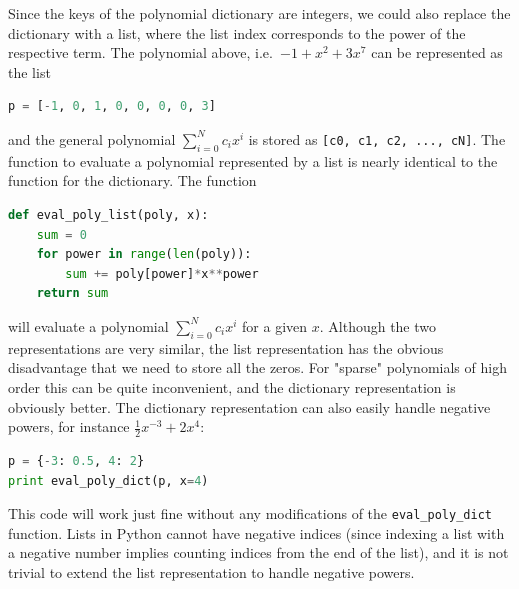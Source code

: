 \documentclass[graybox,envcountchap,sectrefs,final]{svmonodo}
\begin{document}
Since the keys of the polynomial dictionary are integers, we could also replace the dictionary
with a list, where the list index corresponds to the power of the respective term.
The polynomial above, i.e.~$-1 + x^2 + 3x^7$ can be represented as the list
\begin{lstlisting}[language=Python,style=blue1]
p = [-1, 0, 1, 0, 0, 0, 0, 3]
\end{lstlisting}
and the general polynomial $\sum_{i=0}^N c_ix^i$ is stored as
\texttt{[c0, c1, c2, ..., cN]}. The function to evaluate a polynomial represented by a list is
nearly identical to the function for the dictionary. The function
\begin{lstlisting}[language=Python,style=blue1]
def eval_poly_list(poly, x):
    sum = 0
    for power in range(len(poly)):
        sum += poly[power]*x**power
    return sum
\end{lstlisting}
will evaluate a polynomial $\sum_{i=0}^N c_ix^i$ for a given $x$. Although the two
representations are very similar, the list representation has the obvious disadvantage
that we need to store all the zeros. For "sparse" polynomials of high order this can be
quite inconvenient, and the dictionary representation is obviously better.
The dictionary representation can also easily handle negative powers,
for instance $\frac{1}{2} x^{-3} + 2x^4$:
\begin{lstlisting}[language=Python,style=blue1]
p = {-3: 0.5, 4: 2}
print eval_poly_dict(p, x=4)
\end{lstlisting}
This code will work just fine without any modifications of the \Verb!eval_poly_dict!
function. Lists in Python cannot have negative indices (since indexing a list with a negative number
implies counting indices from the end of the list), and it is not trivial to extend the list representation to
handle negative powers.
\end{document}
